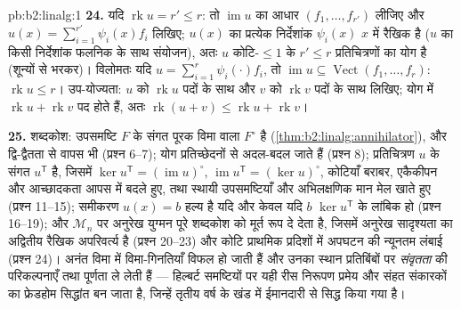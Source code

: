 \begin{solution}{pb:b2:linalg:1}
\textbf{24.} यदि $\operatorname{rk} u = r' \leq r$: तो $\operatorname{im} u$ का आधार $(f_1, \dots, f_{r'})$ लीजिए और $u(x)
= \sum_{i=1}^{r'} \psi_i(x) f_i$ लिखिए; $u(x)$ का
प्रत्येक निर्देशांक $\psi_i(x)$ $x$ में रैखिक है ($u$ का किसी निर्देशांक
फलनिक के साथ संयोजन), अतः $u$ कोटि-$\leq1$ के $r' \leq r$ प्रतिचित्रणों का योग है
(शून्यों से भरकर)। विलोमतः यदि $u = \sum_{i=1}^r \psi_i(\cdot)f_i$, तो $\operatorname{im} u \subseteq \operatorname{Vect}(f_1,
\dots, f_r)$: $\operatorname{rk} u \leq r$। उप-योज्यता: $u$
को $\operatorname{rk} u$ पदों के साथ और $v$ को $\operatorname{rk} v$ पदों के साथ लिखिए; योग में $\operatorname{rk} u +
\operatorname{rk} v$
पद होते हैं, अतः $\operatorname{rk}(u + v) \leq
\operatorname{rk} u + \operatorname{rk} v$।

\textbf{25.} शब्दकोश: उपसमष्टि $F$ के संगत पूरक विमा वाला $F^\circ$ है
(\cref{thm:b2:linalg:annihilator}), और द्वि-द्वैतता से वापस भी (प्रश्न 6--7); योग प्रतिच्छेदनों से
अदल-बदल जाते हैं (प्रश्न 8); प्रतिचित्रण $u$ के संगत $u^{\mathsf T}$ है, जिसमें
$\ker u^{\mathsf T}
= (\operatorname{im}u)^\circ$, $\operatorname{im}u^{\mathsf T} =
(\ker u)^\circ$, कोटियाँ बराबर, एकैकीपन और आच्छादकता आपस में बदले हुए, तथा
स्थायी उपसमष्टियाँ और अभिलक्षणिक मान मेल खाते हुए (प्रश्न 11--15);
समीकरण $u(x) = b$ हल्य है यदि और केवल यदि $b$ $\ker u^{\mathsf T}$ के लांबिक हो (प्रश्न
16--19); और $\mathcal{M}_n$ पर अनुरेख युग्मन पूरे शब्दकोश को मूर्त रूप दे देता है,
जिसमें अनुरेख सादृश्यता का अद्वितीय रैखिक अपरिवर्त्य है (प्रश्न 20--23)
और कोटि प्राथमिक प्रदिशों में अपघटन की न्यूनतम लंबाई (प्रश्न 24)। अनंत
विमा में विमा-गिनतियाँ विफल हो जाती हैं और उनका स्थान प्रतिबिंबों पर
\emph{संवृतता} की परिकल्पनाएँ तथा पूर्णता ले लेती हैं --- हिल्बर्ट
समष्टियों पर यही रीस निरूपण प्रमेय और संहत संकारकों का फ्रेडहोम
सिद्धांत बन जाता है, जिन्हें तृतीय वर्ष के खंड में ईमानदारी से सिद्ध
किया गया है।
\end{solution}
